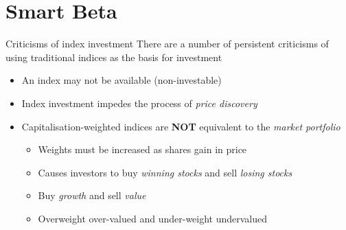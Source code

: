 \documentclass[14pt,xcolor=pdftex,dvipsnames,table]{beamer}\usepackage[]{graphicx}\usepackage[]{color}
\begin{document}
%


\section{Smart Beta}
\begin{frame}{Criticisms of index investment}
There are a number of persistent criticisms of using traditional indices as the basis for investment
\begin{itemize}[<+-| alert@+>]
\pause
\item An index may not be available (non-investable)
\item Index investment impedes the process of \emph{price discovery}
\item Capitalisation-weighted indices are \textbf{NOT} equivalent to the \emph{market portfolio}
\begin{itemize}
\item Weights must be increased as shares gain in price
\item Causes investors to buy \emph{winning stocks} and sell \emph{losing stocks}
\item Buy \emph{growth} and sell \emph{value}
\item Overweight over-valued and under-weight undervalued
\end{itemize}
 
\end{itemize}
\end{frame}
\end{document}
